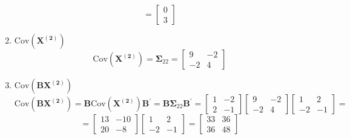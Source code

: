 \begin{enumerate}[label=(\alph*)]
\[                =
                \begin{bmatrix}
                    0 \\
                    3
                \end{bmatrix}
            \]
            \item $\text{Cov}\left(\mathbf{X^{(2)}}\right)$
            \[
                \text{Cov}\left(\mathbf{X^{(2)}}\right)
                =
                \mathbf{\Sigma}_{22}
                =
                \begin{bmatrix}
                    9 & -2 \\
                    -2 & 4
                \end{bmatrix}
            \]
            \item $\text{Cov}\left(\mathbf{B}\mathbf{X^{(2)}}\right)$
            \[
                \text{Cov}\left(\mathbf{B}\mathbf{X^{(2)}}\right)
                =
                \mathbf{B}\text{Cov}\left(\mathbf{X^{(2)}}\right)\mathbf{B}^\prime
                =
                \mathbf{B}\mathbf{\Sigma}_{22}\mathbf{B}^\prime
                =
                \begin{bmatrix}
                    1 & -2 \\
                    2 & -1
                \end{bmatrix}
                \begin{bmatrix}
                    9 & -2 \\
                    -2 & 4
                \end{bmatrix}
                \begin{bmatrix}
                    1 & 2 \\
                    -2 & -1
                \end{bmatrix}
                =
            \]
            \[
                =
                \begin{bmatrix}
                    13 & -10 \\
                    20 & -8
                \end{bmatrix}
                \begin{bmatrix}
                    1 & 2 \\
                    -2 & -1
                \end{bmatrix}
                = 
                \begin{bmatrix}
                    33 & 36 \\
                    36 & 48

\end{bmatrix}\]
\end{enumerate}
